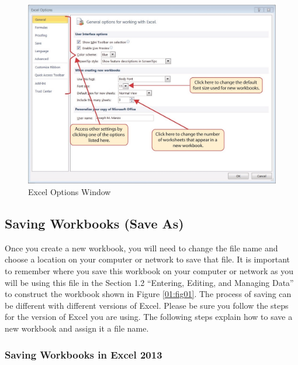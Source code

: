 \begin{figure}[H]
	\centering
	\includegraphics[width=\maxwidth{.95\linewidth}]{gfx/ch01_fig10}
	\caption{Excel Options Window}
	\label{01:fig10}
\end{figure}

\subsection{Saving Workbooks (Save As)}

Once you create a new workbook, you will need to change the file name and choose a location on your computer or network to save that file. It is important to remember where you save this workbook on your computer or network as you will be using this file in the Section 1.2 “Entering, Editing, and Managing Data” to construct the workbook shown in Figure \ref{01:fig01}. The process of saving can be different with different versions of Excel. Please be sure you follow the steps for the version of Excel you are using. The following steps explain how to save a new workbook and assign it a file name.

\subsubsection{Saving Workbooks in Excel 2013}

